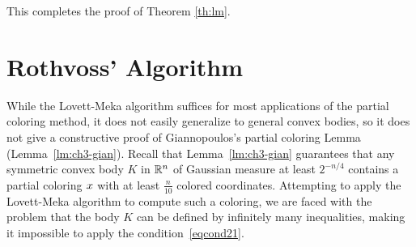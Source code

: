 This completes the proof of Theorem \ref{th:lm}.

\section{Rothvoss' Algorithm}
\label{sec:ch4-rothvoss}
While the Lovett-Meka algorithm suffices for most applications of the partial coloring method, it does not easily generalize to general convex bodies, so it does not give a constructive proof of Giannopoulos's partial coloring Lemma (Lemma~\ref{lm:ch3-gian}). Recall that Lemma~\ref{lm:ch3-gian} guarantees that any symmetric convex body $K$ in $\mathbb{R}^n$ of Gaussian measure at least $2^{-n/4}$ contains a partial coloring $x$ with at least $\frac{n}{10}$ colored coordinates. Attempting to apply the Lovett-Meka algorithm to compute such a coloring, we are faced with the problem that the body $K$ can be defined by infinitely many inequalities, making it impossible to apply the condition~\eqref{eqcond21}.

